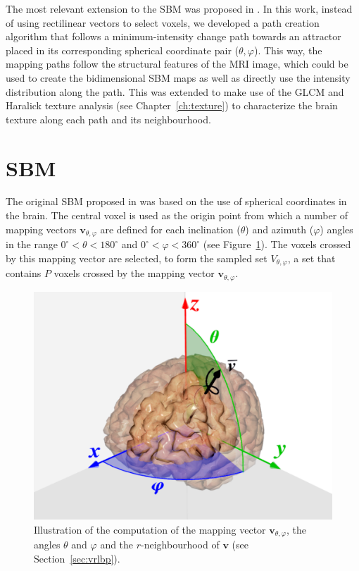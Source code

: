 The most relevant extension to the \ac{SBM} was proposed in \cite{Martinez-Murcia2016}. In this work, instead of using rectilinear vectors to select voxels, we developed a path creation algorithm that follows a minimum-intensity change path towards an attractor placed in its corresponding spherical coordinate pair ($\theta,\varphi$). This way, the mapping paths follow the structural features of the \ac{MRI} image, which could be used to create the bidimensional \ac{SBM} maps as well as directly use the intensity distribution along the path. This was extended to make use of the \ac{GLCM} and Haralick texture analysis (see Chapter~\ref{ch:texture}) to characterize the brain texture along each path and its neighbourhood. 


\section{\acf{SBM}}\label{sec:mapping}
The original \ac{SBM} proposed in \cite{Martinez-Murcia2014225,Martinez-Murcia2015} was based on the use of spherical coordinates in the brain. The central voxel is used as the origin point from which a number of mapping vectors $\mathbf{v}_{\theta,\varphi}$ are defined for each inclination ($\theta$) and azimuth ($\varphi$) angles in the range $0^{\circ}<\theta<180^{\circ}$ and $0^{\circ}<\varphi<360^{\circ}$ (see Figure~\ref{fig:brainmapping}). The voxels crossed by this mapping vector are selected, to form the sampled set $V_{\theta,\varphi}$, a set that contains $P$ voxels crossed by the mapping vector $\mathbf{v}_{\theta,\varphi}$.

\begin{figure}[htp]
	\centering
	\includegraphics[width=0.7\columnwidth]{Graphics/ch6/02-projection}
	\caption{Illustration of the computation of the mapping vector $\mathbf{v}_{\theta,\varphi}$, the angles $\theta$ and $\varphi$ and the $r$-neighbourhood of $\mathbf{v}$ (see Section~\ref{sec:vrlbp}).}
	\label{fig:brainmapping}
\end{figure}

